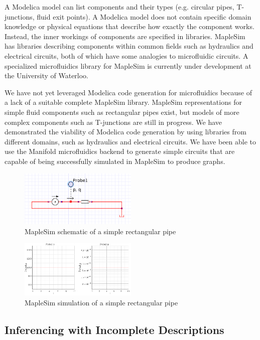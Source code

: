 A Modelica model can list components and their types (e.g. circular pipes, T-junctions, fluid exit points).
A Modelica model does not contain specific domain knowledge or physical equations that describe how exactly the component works.
Instead, the inner workings of components are specified in libraries.
MapleSim has libraries describing components within common fields such as hydraulics and electrical circuits, both of which have some analogies to microfluidic circuits.
A specialized microfluidics library for MapleSim is currently under development at the University of Waterloo.

We have not yet leveraged Modelica code generation for microfluidics because of a lack of a suitable complete MapleSim library.
MapleSim representations for simple fluid components such as rectangular pipes exist, but models of more complex components such as T-junctions are still in progress.
We have demonstrated the viability of Modelica code generation by using libraries from different domains, such as hydraulics and electrical circuits.
We have been able to use the Manifold microfluidics backend to generate simple circuits that are capable of being successfully simulated in MapleSim to produce graphs.

\begin{figure}[!ht]
  \caption{MapleSim schematic of a simple rectangular pipe}
  \centering
    \includegraphics[width=0.5\textwidth]{img/simple-pipe.png}
\end{figure}
\begin{figure}[!ht]
  \caption{MapleSim simulation of a simple rectangular pipe}
  \centering
    \includegraphics[width=0.5\textwidth]{img/simple-pipe-simulation.png}
\end{figure}

\subsection{Inferencing with Incomplete Descriptions}

